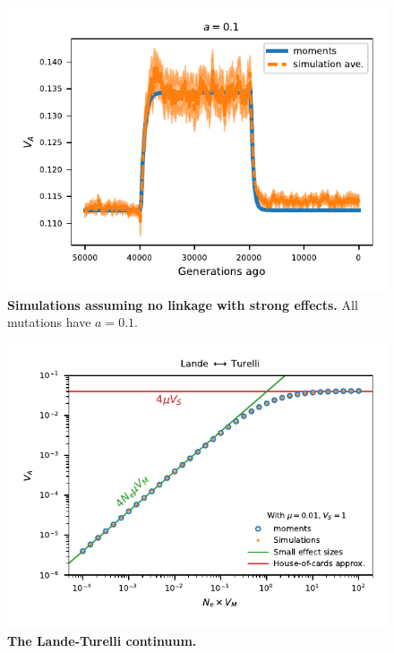 \documentclass[]{article}
\begin{document}
\begin{figure}[ht!]
    \centering
    \includegraphics{../figures/one_pop.a_0.1.pdf}
    \caption{
        \textbf{Simulations assuming no linkage with strong effects.}
        All mutations have $a=0.1$.
    }
    \label{fig:one-popC}
\end{figure}

\begin{figure}[ht!]
    \centering
    \includegraphics{../figures/vary_SD.pdf}
    \caption{
        \textbf{The Lande-Turelli continuum.}
    }
    \label{fig:turreli-lande}
\end{figure}
\end{document}
